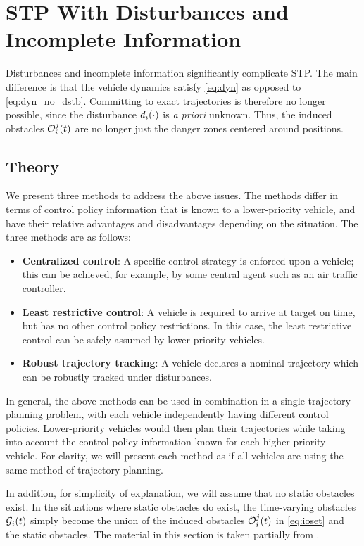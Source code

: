 \section{STP With Disturbances and Incomplete Information \label{sec:incomp}}
Disturbances and incomplete information significantly complicate STP. The main difference is that the vehicle dynamics satisfy \eqref{eq:dyn} as opposed to \eqref{eq:dyn_no_dstb}. Committing to exact trajectories is therefore no longer possible, since the disturbance $d_i(\cdot)$ is \textit{a priori} unknown. Thus, the induced obstacles $\mathcal{O}_i^j(t)$ are no longer just the danger zones centered around positions. 

\subsection{Theory}
We present three methods to address the above issues. The methods differ in terms of control policy information that is known to a lower-priority vehicle, and have their relative advantages and disadvantages depending on the situation. The three methods are as follows:
\begin{itemize}[leftmargin = 0.4cm]
\item \textbf{Centralized control}: A specific control strategy is enforced upon a vehicle; this can be achieved, for example, by some central agent such as an air traffic controller.
\item \textbf{Least restrictive control}: A vehicle is required to arrive at target on time, but has no other control policy restrictions. In this case, the least restrictive control can be safely assumed by lower-priority vehicles.
\item \textbf{Robust trajectory tracking}: A vehicle declares a nominal trajectory which can be robustly tracked under disturbances.
\end{itemize}

In general, the above methods can be used in combination in a single trajectory planning problem, with each vehicle independently having different control policies. Lower-priority vehicles would then plan their trajectories while taking into account the control policy information known for each higher-priority vehicle. For clarity, we will present each method as if all vehicles are using the same method of trajectory planning.

In addition, for simplicity of explanation, we will assume that no static obstacles exist. In the situations where static obstacles do exist, the time-varying obstacles $\mathcal{G}_i(t)$ simply become the union of the induced obstacles $\mathcal{O}_i^j(t)$ in \eqref{eq:ioset} and the static obstacles. The material in this section is taken partially from \cite{Bansal2017}.

